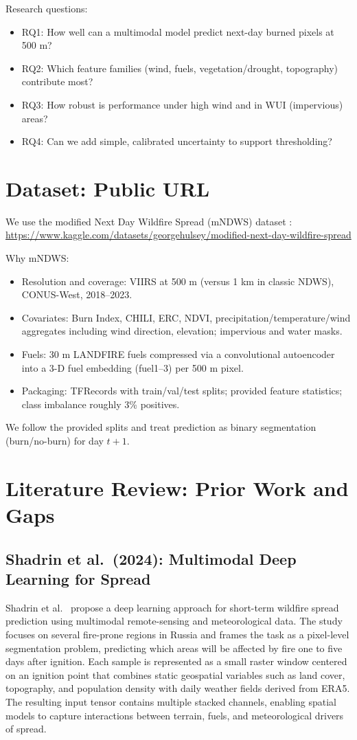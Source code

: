 \documentclass[conference]{IEEEtran}
\begin{document}
Research questions:
\begin{itemize}
    \item RQ1: How well can a multimodal model predict next-day burned pixels at 500 m?
    \item RQ2: Which feature families (wind, fuels, vegetation/drought, topography) contribute most?
    \item RQ3: How robust is performance under high wind and in WUI (impervious) areas?
    \item RQ4: Can we add simple, calibrated uncertainty to support thresholding?
\end{itemize}

\section{Dataset: Public URL}
We use the modified Next Day Wildfire Spread (mNDWS) dataset \cite{hulsey2024mndws}: \url{https://www.kaggle.com/datasets/georgehulsey/modified-next-day-wildfire-spread}

Why mNDWS:
\begin{itemize}
    \item Resolution and coverage: VIIRS at 500 m (versus 1 km in classic NDWS), CONUS-West, 2018--2023.
    \item Covariates: Burn Index, CHILI, ERC, NDVI, precipitation/temperature/wind aggregates including wind direction, elevation; impervious and water masks.
    \item Fuels: 30 m LANDFIRE fuels compressed via a convolutional autoencoder into a 3-D fuel embedding (fuel1--3) per 500 m pixel.
    \item Packaging: TFRecords with train/val/test splits; provided feature statistics; class imbalance roughly 3\% positives.
\end{itemize}

We follow the provided splits and treat prediction as binary segmentation (burn/no-burn) for day $t{+}1$.

\section{Literature Review: Prior Work and Gaps}
\subsection{Shadrin et al.\ (2024): Multimodal Deep Learning for Spread}
Shadrin et al.\ \cite{shadrin2024scientificreports} propose a deep learning approach for short-term wildfire spread prediction using multimodal remote-sensing and meteorological data. The study focuses on several fire-prone regions in Russia and frames the task as a pixel-level segmentation problem, predicting which areas will be affected by fire one to five days after ignition. Each sample is represented as a small raster window centered on an ignition point that combines static geospatial variables such as land cover, topography, and population density with daily weather fields derived from ERA5. The resulting input tensor contains multiple stacked channels, enabling spatial models to capture interactions between terrain, fuels, and meteorological drivers of spread.
\end{document}

